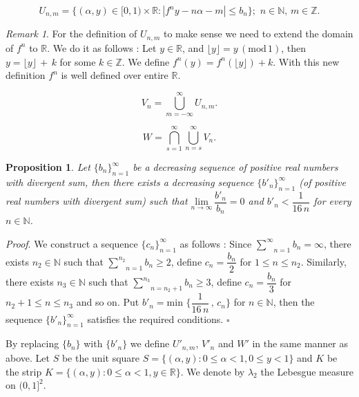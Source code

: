 \documentclass[11pt, english, reqno]{amsart}
\newtheorem{proposition}[theorem]{Proposition}
\theoremstyle{definition}
\theoremstyle{remark}
\newtheorem{remark}[theorem]{Remark}
\numberwithin{equation}{section}
\numberwithin{equation}{section}
\newcommand{\Z}{{\mathbb Z}}
\newcommand{\R}{{\mathbb R}}
\begin{document}
\begin{equation}\label{defU}
    U_{n,m} = \{(\alpha,y) \in [0,1)\times \mathbb{R} : |f^n y -n\alpha - m| \leq b_n\} ;\,\, n\in \mathbb{N}, \, m \in \mathbb{Z}.
\end{equation}

\begin{remark}\label{rem 1} For the definition of $U_{n,m}$ to make sense we need to extend the domain of $f^n$ to $\R$. We do it as follows : Let $y \in \R$, and $\lfloor y \rfloor = y \, (\mathrm{mod} \, 1)$, then $y = \lfloor y \rfloor \, + \, k$ for some $k \in \Z$. We define $f^n (y) = f^n (\lfloor y \rfloor) + k$. With this new definition $f^n$ is well defined over entire $\mathbb{R}$.


\end{remark}
\begin{equation}
    V_n = \underset{m=-\infty}{\overset{\infty}{\bigcup}} U_{n,m}. 
\end{equation}

\begin{equation}
    W = \underset{s=1}{\overset{\infty}{\bigcap}} \underset{n=s}{\overset{\infty}{\bigcup}}V_n.
\end{equation}

\begin{proposition} Let $\{b_n\}_{n=1}^{\infty}$ be a decreasing sequence  of positive real numbers with divergent sum, then there exists a decreasing sequence $\{b'_n\}_{n=1}^{\infty}$ (of positive real numbers with divergent sum) such that $\underset{n \rightarrow \infty}{\mathrm{lim}}\, \dfrac{b'_n}{b_n} = 0$ and $b'_n < \dfrac{1}{16\,n}$ for every $n \in \mathbb{N}$. 

\end{proposition}

\noindent\textit{Proof}. We construct a sequence $\{c_n\}_{n=1}^{\infty}$ as follows : Since $\underset{n=1}{\overset{\infty}{\sum}} b_n =\infty$, there exists $n_2 \in \mathbb{N}$ such that $\underset{n=1}{\overset{n_2}{\sum}} b_n \geq 2$, define $c_n = \dfrac{b_n}{2}$ for $1 \leq n\leq n_2$. Similarly, there exists $n_3 \in \mathbb{N}$ such that $\underset{n = n_2 + 1}{\overset{n_3}{\sum}} b_n \geq 3$, define $c_n = \dfrac{b_n}{3}$ for $n_2 + 1 \leq n\leq n_3$ and so on. Put $b'_n = \mathrm{min}\,\, \{\dfrac{1}{16\,n}\,,\, c_n\}$ for $n \in \mathbb{N}$, then the sequence $\{b'_n\}_{n=1}^{\infty}$ satisfies the required conditions. \hfill{$\square$}



By replacing $\{b_n\}$ with $\{b'_n\}$ we define $U'_{n,m}$, $V'_n$ and $W'$ in the same manner as above. Let $S$ be the unit square $S = \{(\alpha,y) : 0\leq \alpha <1,0\leq y < 1\}$ and $K$ be the strip $ K = \{(\alpha,y) :0\leq \alpha < 1, y \in \mathbb{R}\}$. We denote by $\lambda_2$ the Lebesgue measure on $(0,1]^2$. 
\end{document}

